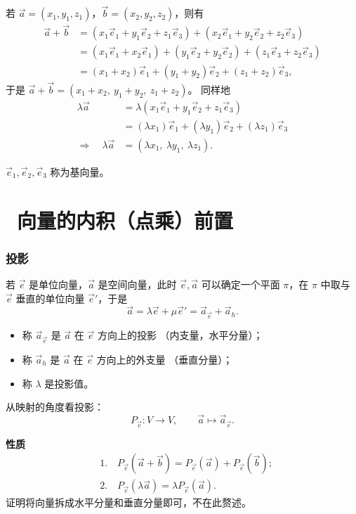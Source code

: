 \documentclass[UTF8,11pt]{ctexart}
\theoremstyle{cnthm}
\begin{document}
若 $\vec a=(x_1,y_1,z_1)$，$\vec b=(x_2,y_2,z_2)$，则有
\[
\begin{aligned}
\vec a+\vec b
&=(x_1\vec e_1+y_1\vec e_2+z_1\vec e_3)
+(x_2\vec e_1+y_2\vec e_2+z_2\vec e_3)\\
&=(x_1\vec e_1+x_2\vec e_1)+(y_1\vec e_2+y_2\vec e_2)
+(z_1\vec e_3+z_2\vec e_3)\\
&=(x_1+x_2)\vec e_1+(y_1+y_2)\vec e_2+(z_1+z_2)\vec e_3 ,
\end{aligned}
\]
于是
$\vec a+\vec b=(x_1+x_2,\ y_1+y_2,\ z_1+z_2)$。
同样地
\[
\begin{aligned}
\lambda\vec a
&=\lambda(x_1\vec e_1+y_1\vec e_2+z_1\vec e_3)\\
&=(\lambda x_1)\vec e_1+(\lambda y_1)\vec e_2+(\lambda z_1)\vec e_3\\
\Longrightarrow\quad
\lambda\vec a&=(\lambda x_1,\ \lambda y_1,\ \lambda z_1).
\end{aligned}
\]

$\vec e_1,\vec e_2,\vec e_3$ 称为基向量。

\section{\ 向量的内积（点乘）前置}

\subsubsection*{投影}

若 $\vec e$ 是单位向量，$\vec a$ 是空间向量，此时
$\vec e,\vec a$ 可以确定一个平面 $\pi$，在 $\pi$ 中取与
$\vec e$ 垂直的单位向量 $\vec e'$，于是
\[
\vec a=\lambda\vec e+\mu\vec e'
=\vec a_{\vec e}+\vec a_h .
\]

\begin{itemize}
\item 称 $\vec a_{\vec e}$ 是 $\vec a$ 在 $\vec e$ 方向上的投影
（内支量，水平分量）；
\item 称 $\vec a_h$ 是 $\vec a$ 在 $\vec e$ 方向上的外支量
（垂直分量）；
\item 称 $\lambda$ 是投影值。
\end{itemize}

从映射的角度看投影：
\[
P_{\vec e}:V\to V,\qquad \vec a\longmapsto\vec a_{\vec e} .
\]

\textbf{性质}
\[
\begin{aligned}
&1.\quad P_{\vec e}(\vec a+\vec b)
=P_{\vec e}(\vec a)+P_{\vec e}(\vec b);\\
&2.\quad P_{\vec e}(\lambda\vec a)
=\lambda P_{\vec e}(\vec a).
\end{aligned}
\]
证明将向量拆成水平分量和垂直分量即可，不在此赘述。
\end{document}
